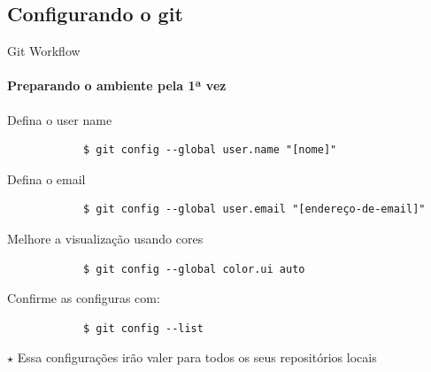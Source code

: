 \documentclass[xcolor=dvipsnames,t]{beamer}
\begin{document}
\begin{frame}{}
	\tiny
	\tableofcontents[current]
\end{frame}

\subsection{Configurando o git}
\begin{frame}[fragile]{Git Workflow}
	\framesubtitle{Preparando o ambiente pela 1ª vez}

	\begin{block}{Defina o user name}		
		\begin{verbatim}
			$ git config --global user.name "[nome]"
		\end{verbatim}
	\end{block}
	
	\begin{block}{Defina o email}
		\begin{verbatim}
			$ git config --global user.email "[endereço-de-email]"
		\end{verbatim}
	\end{block}

	\begin{exampleblock}{Melhore a visualização usando cores}
		\begin{verbatim}
			$ git config --global color.ui auto
		\end{verbatim}
	\end{exampleblock}

	\begin{exampleblock}{Confirme as configuras com:}
		\begin{verbatim}
			$ git config --list
		\end{verbatim}
\end{exampleblock}

{\footnotesize $ \star $ Essa configurações irão valer para todos os seus repositórios locais}
\end{frame}
\end{document}
